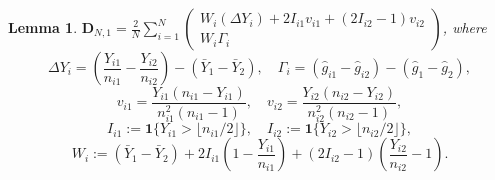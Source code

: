 \documentclass[12pt,letterpaper]{article}
\newtheorem{lemma}{Lemma}[section]
\begin{document}
\begin{lemma}\label{lemma:D:N,1:rewritten}
$\displaystyle\mathbf{D}_{N,1}=\frac{2}{N}\sum_{i=1}^N\begin{pmatrix}
    W_i(\Delta Y_i)+2I_{i1}v_{i1}+(2I_{i2}-1)v_{i2}\\
    W_i\Gamma_i
\end{pmatrix}$,
where
$$\Delta Y_i=\left(\frac{Y_{i1}}{n_{i1}}-\frac{Y_{i2}}{n_{i2}}\right)-(\bar{Y}_1-\bar{Y}_2),\quad \Gamma_i=(\hat{g}_{i1}-\hat{g}_{i2})-(\hat{g}_1-\hat{g}_2),$$
$$v_{i1}=\frac{Y_{i1}(n_{i1}-Y_{i1})}{n_{i1}^2(n_{i1}-1)},\quad v_{i2}=\frac{Y_{i2}(n_{i2}-Y_{i2})}{n_{i2}^2(n_{i2}-1)},$$
$$I_{i1}:=\mathbf{1}\{Y_{i1}>\lfloor n_{i1}/2\rfloor\},\quad I_{i2}:=\mathbf{1}\{Y_{i2}>\lfloor n_{i2}/2\rfloor\},$$
$$W_i:=(\bar{Y}_1-\bar{Y}_2)+2I_{i1}\left(1-\frac{Y_{i1}}{n_{i1}}\right)+(2I_{i2}-1)\left(\frac{Y_{i2}}{n_{i2}}-1\right).$$
\end{lemma}
\end{document}

